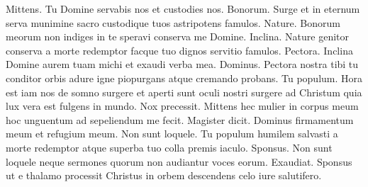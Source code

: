 \begin{multicols*}{2}
 Mittens.
 Tu Domine servabis nos et custodies nos.
 Bonorum.
 Surge et in eternum serva munimine sacro custodique tuos astripotens famulos.
 Nature.
 Bonorum meorum non indiges in te speravi conserva me Domine.
 Inclina.
 Nature genitor conserva a morte redemptor facque tuo dignos servitio famulos.
 Pectora.
 Inclina Domine aurem tuam michi et exaudi verba mea.
 Dominus.
 Pectora nostra tibi tu conditor orbis adure igne piopurgans atque cremando probans.
 Tu populum.
 Hora est iam nos de somno surgere et aperti sunt oculi nostri surgere ad Christum quia lux vera est fulgens in mundo.
 Nox precessit.
 Mittens hec mulier in corpus meum hoc unguentum ad sepeliendum me fecit.
 Magister dicit.
 Dominus firmamentum meum et refugium meum.
 Non sunt loquele.
 Tu populum humilem salvasti a morte redemptor atque superba tuo colla premis iaculo.
 Sponsus.
 Non sunt loquele neque sermones quorum non audiantur voces eorum.
 Exaudiat.
 Sponsus ut e thalamo processit Christus in orbem descendens celo iure salutifero.

\end{multicols*}
